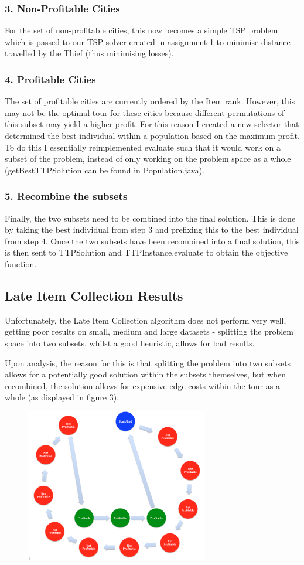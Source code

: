 \documentclass[a4paper,12pt]{article}
\begin{document}
\subsubsection*{3. Non-Profitable Cities}
For the set of non-profitable cities, this now becomes a simple TSP problem which is passed to our TSP solver created in assignment 1 to minimise distance travelled by the Thief (thus minimising losses).

\subsubsection*{4. Profitable Cities}
The set of profitable cities are currently ordered by the Item rank. However, this may not be the optimal tour for these cities because different permutations of this subset may yield a higher profit. For this reason I created a new selector that determined the best individual within a population based on the maximum profit. To do this I essentially reimplemented evaluate such that it would work on a subset of the problem, instead of only working on the problem space as a whole (getBestTTPSolution can be found in Population.java).

\subsubsection*{5. Recombine the subsets}
Finally, the two subsets need to be combined into the final solution. This is done by taking the best individual from step 3 and prefixing this to the best individual from step 4. Once the two subsets have been recombined into a final solution, this is then sent to TTPSolution and TTPInstance.evaluate to obtain the objective function.


\subsection*{Late Item Collection Results}
Unfortunately, the Late Item Collection algorithm does not perform very well, getting poor results on small, medium and large datasets - splitting the problem space into two subsets, whilst a good heuristic, allows for bad results.

Upon analysis, the reason for this is that splitting the problem into two subsets allows for a potentially good solution within the subsets themselves, but when recombined, the solution allows for expensive edge costs within the tour as a whole (as displayed in figure 3).
\begin{figure}[h]
\centering
\includegraphics[width=80mm]{TheIssue.png}
\end{figure}
\end{document}
